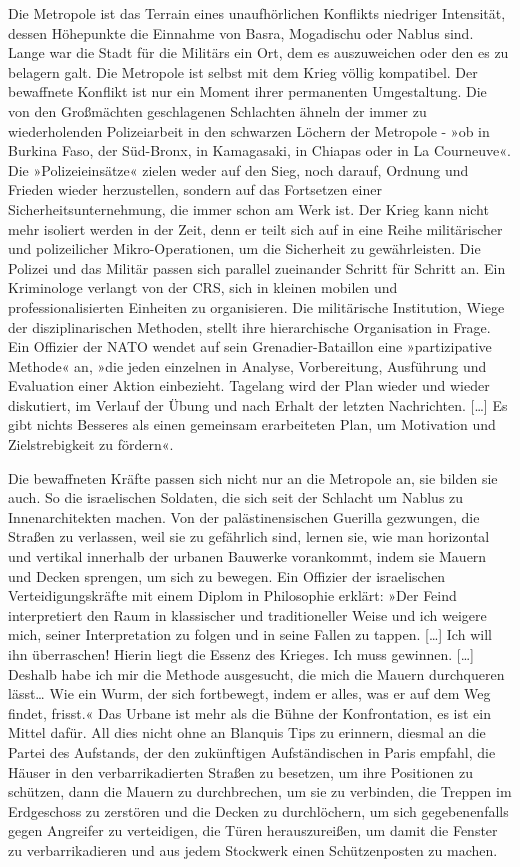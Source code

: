 Die Metropole ist das Terrain eines unaufhörlichen Konflikts
niedriger Intensität, dessen Höhepunkte die Einnahme von Basra,
Mogadischu oder Nablus sind. Lange war die Stadt für die Militärs
ein Ort, dem es auszuweichen oder den es zu belagern galt. Die
Metropole ist selbst mit dem Krieg völlig kompatibel. Der
bewaffnete Konflikt ist nur ein Moment ihrer permanenten
Umgestaltung. Die von den Großmächten geschlagenen Schlachten
ähneln der immer zu wiederholenden Polizeiarbeit in den schwarzen
Löchern der Metropole - »ob in Burkina Faso, der Süd-Bronx, in
Kamagasaki, in Chiapas oder in La Courneuve«. Die »Polizeieinsätze«
zielen weder auf den Sieg, noch darauf, Ordnung und Frieden wieder
herzustellen, sondern auf das Fortsetzen einer
Sicherheitsunternehmung, die immer schon am Werk ist. Der Krieg
kann nicht mehr isoliert werden in der Zeit, denn er teilt sich auf
in eine Reihe militärischer und polizeilicher Mikro-Operationen, um
die Sicherheit zu gewährleisten.
Die Polizei und das Militär passen sich parallel zueinander Schritt
für Schritt an. Ein Kriminologe verlangt von der CRS, sich in
kleinen mobilen und professionalisierten Einheiten zu organisieren.
Die militärische Institution, Wiege der disziplinarischen Methoden,
stellt ihre hierarchische Organisation in Frage. Ein Offizier der
NATO wendet auf sein Grenadier-Bataillon eine »partizipative
Methode« an, »die jeden einzelnen in Analyse, Vorbereitung,
Ausführung und Evaluation einer Aktion einbezieht. Tagelang wird
der Plan wieder und wieder diskutiert, im Verlauf der Übung und
nach Erhalt der letzten Nachrichten. […] Es gibt nichts Besseres
als einen gemeinsam erarbeiteten Plan, um Motivation und
Zielstrebigkeit zu fördern«.

Die bewaffneten Kräfte passen sich nicht nur an die Metropole an,
sie bilden sie auch. So die israelischen Soldaten, die sich seit
der Schlacht um Nablus zu Innenarchitekten machen. Von der
palästinensischen Guerilla gezwungen, die Straßen zu verlassen,
weil sie zu gefährlich sind, lernen sie, wie man horizontal und
vertikal innerhalb der urbanen Bauwerke vorankommt, indem sie
Mauern und Decken sprengen, um sich zu bewegen. Ein Offizier der
israelischen Verteidigungskräfte mit einem Diplom in Philosophie
erklärt: »Der Feind interpretiert den Raum in klassischer und
traditioneller Weise und ich weigere mich, seiner Interpretation zu
folgen und in seine Fallen zu tappen. […] Ich will ihn überraschen!
Hierin liegt die Essenz des Krieges. Ich muss gewinnen. […] Deshalb
habe ich mir die Methode ausgesucht, die mich die Mauern
durchqueren lässt\ldots{} Wie ein Wurm, der sich fortbewegt, indem er
alles, was er auf dem Weg findet, frisst.« Das Urbane ist mehr als
die Bühne der Konfrontation, es ist ein Mittel dafür. All dies
nicht ohne an Blanquis Tips zu erinnern, diesmal an die Partei des
Aufstands, der den zukünftigen Aufständischen in Paris empfahl, die
Häuser in den verbarrikadierten Straßen zu besetzen, um ihre
Positionen zu schützen, dann die Mauern zu durchbrechen, um sie zu
verbinden, die Treppen im Erdgeschoss zu zerstören und die Decken
zu durchlöchern, um sich gegebenenfalls gegen Angreifer zu
verteidigen, die Türen herauszureißen, um damit die Fenster zu
verbarrikadieren und aus jedem Stockwerk einen Schützenposten zu
machen.

